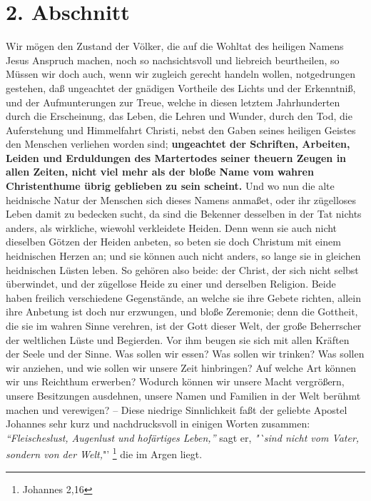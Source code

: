 \section{2. Abschnitt} \label{kap1_ab2}

Wir mögen den Zustand der Völker, die auf die Wohltat des heiligen Namens Jesus
Anspruch machen, noch so nachsichtsvoll und liebreich beurtheilen, so Müssen wir
doch auch, wenn wir zugleich gerecht handeln wollen, notgedrungen gestehen, daß
ungeachtet der gnädigen Vortheile des Lichts und der Erkenntniß, und der
Aufmunterungen zur Treue, welche in diesen letztem Jahrhunderten durch die
Erscheinung, das Leben, die Lehren und Wunder, durch den Tod, die Auferstehung
und Himmelfahrt Christi, nebst den Gaben seines heiligen Geistes den Menschen
verliehen worden sind; \textbf{ungeachtet der Schriften, Arbeiten, Leiden und
Erduldungen des Martertodes seiner theuern Zeugen in allen Zeiten, nicht viel
mehr als der bloße Name vom wahren Christenthume übrig geblieben zu sein
scheint.} Und wo nun die alte heidnische Natur der Menschen sich dieses Namens
anmaßet, oder ihr zügelloses Leben damit zu bedecken sucht, da sind die Bekenner
desselben in der Tat nichts anders, als wirkliche, wiewohl verkleidete Heiden.
Denn wenn sie auch nicht dieselben Götzen der Heiden anbeten, so beten sie doch
Christum mit einem heidnischen Herzen an; und sie können auch nicht anders, so
lange sie in gleichen heidnischen Lüsten leben. So gehören also beide: der
Christ, der sich nicht selbst überwindet, und der zügellose Heide zu einer und
derselben Religion. Beide haben freilich verschiedene Gegenstände,
an welche sie ihre Gebete richten, allein ihre Anbetung ist doch nur erzwungen,
und bloße Zeremonie; denn die Gottheit, die sie im wahren Sinne verehren, ist
der Gott dieser Welt, der große Beherrscher der weltlichen Lüste und Begierden.
Vor ihm beugen sie sich mit allen Kräften der Seele und der Sinne. Was sollen
wir essen? Was sollen wir trinken? Was sollen wir anziehen, und wie sollen wir
unsere Zeit hinbringen? Auf welche Art können wir uns Reichthum erwerben?
Wodurch können wir unsere Macht vergrößern, unsere Besitzungen ausdehnen, unsere
Namen und Familien in der Welt berühmt machen und verewigen? -- Diese niedrige
Sinnlichkeit faßt der geliebte Apostel Johannes sehr kurz und nachdrucksvoll in
einigen Worten zusammen:
\textit{"`Fleischeslust, Augenlust und hofärtiges
Leben,"'} sagt er, \textit{"`sind nicht vom Vater, sondern von der Welt,}"'
\footnote{Johannes 2,16}
die im Argen liegt.

